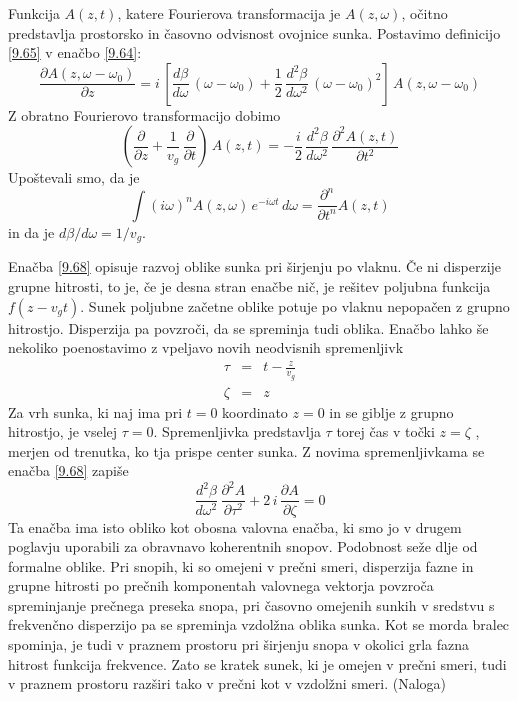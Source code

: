  Funkcija $A\left(z,t\right)$, katere Fourierova transformacija je
$A\left(z,\omega\right)$, očitno predstavlja prostorsko in časovno
odvisnost ovojnice sunka. Postavimo definicijo \ref{9.65} v enačbo
\ref{9.64}: 
\begin{equation}
\frac{\partial A\left(z,\omega-\omega_{0}\right)}{\partial z}=i\,\left[\frac{d\beta}{d\omega}\,\left(\omega-\omega_{0}\right)+\frac{1}{2}\,\frac{d^{2}\beta}{d\omega^{2}}\,\left(\omega-\omega_{0}\right)^{2}\right]\, A\left(z,\omega-\omega_{0}\right)\label{9.67}
\end{equation}
 Z obratno Fourierovo transformacijo dobimo 
\begin{equation}
\left(\frac{\partial}{\partial z}+\frac{1}{v_{g}}\,\frac{\partial}{\partial t}\right)\, A\left(z,t\right)=-\frac{i}{2}\,\frac{d^{2}\beta}{d\omega^{2}}\,\frac{\partial^{2}A\left(z,t\right)}{\partial t^{2}}\label{9.68}
\end{equation}
 Upoštevali smo, da je 
\begin{equation}
\int\left(i\omega\right)^{n}A\left(z,\omega\right)\, e^{-i\omega t}\, d\omega=\frac{\partial^{n}}{\partial t^{n}}A\left(z,t\right)\label{9.69}
\end{equation}
 in da je $d\beta/d\omega=1/v_{g}$.

Enačba \ref{9.68} opisuje razvoj oblike sunka pri širjenju po vlaknu.
Če ni disperzije grupne hitrosti, to je, če je desna stran enačbe
nič, je rešitev poljubna funkcija $f\left(z-v_{g}t\right)$. Sunek
poljubne začetne oblike potuje po vlaknu nepopačen z grupno hitrostjo.
Disperzija pa povzroči, da se spreminja tudi oblika. Enačbo lahko
še nekoliko poenostavimo z vpeljavo novih neodvisnih spremenljivk
\begin{eqnarray}
\tau & = & t-\frac{z}{v_{g}}\nonumber \\
\zeta & = & z\label{9.70}
\end{eqnarray}
 Za vrh sunka, ki naj ima pri $t=0$ koordinato $z=0$ in se giblje
z grupno hitrostjo, je vselej $\tau=0$. Spremenljivka predstavlja
$\tau$ torej čas v točki $z=\zeta$ , merjen od trenutka, ko tja
prispe center sunka. Z novima spremenljivkama se enačba \ref{9.68}
zapiše 
\begin{equation}
\frac{d^{2}\beta}{d\omega^{2}}\,\frac{\partial^{2}A}{\partial\tau^{2}}+2\, i\,\frac{\partial A}{\partial\zeta}=0\label{9.71}
\end{equation}
 Ta enačba ima isto obliko kot obosna valovna enačba, ki smo jo v
drugem poglavju uporabili za obravnavo koherentnih snopov. Podobnost
seže dlje od formalne oblike. Pri snopih, ki so omejeni v prečni smeri,
disperzija fazne in grupne hitrosti po prečnih komponentah valovnega
vektorja povzroča spreminjanje prečnega preseka snopa, pri časovno
omejenih sunkih v sredstvu s frekvenčno disperzijo pa se spreminja
vzdolžna oblika sunka. Kot se morda bralec spominja, je tudi v praznem
prostoru pri širjenju snopa v okolici grla fazna hitrost funkcija
frekvence. Zato se kratek sunek, ki je omejen v prečni smeri, tudi
v praznem prostoru razširi tako v prečni kot v vzdolžni smeri. (Naloga)

